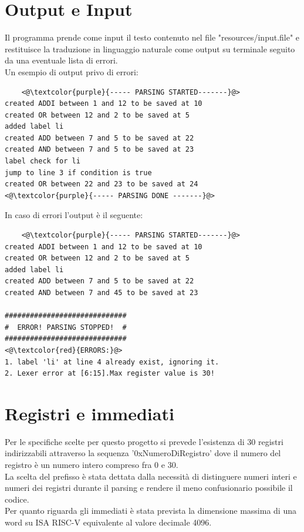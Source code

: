 \section{Output e Input}
Il programma prende come input il testo contenuto nel file "resources/input.file" e restituisce la traduzione in linguaggio naturale come output su terminale seguito da una eventuale lista di errori.
\\Un esempio di output privo di errori:
\begin{lstlisting}
    <@\textcolor{purple}{----- PARSING STARTED-------}@>
created ADDI between 1 and 12 to be saved at 10
created OR between 12 and 2 to be saved at 5
added label li
created ADD between 7 and 5 to be saved at 22
created AND between 7 and 5 to be saved at 23
label check for li
jump to line 3 if condition is true
created OR between 22 and 23 to be saved at 24
<@\textcolor{purple}{----- PARSING DONE -------}@>
\end{lstlisting}
In caso di errori l'output è il seguente:
\begin{lstlisting}
    <@\textcolor{purple}{----- PARSING STARTED-------}@>
created ADDI between 1 and 12 to be saved at 10
created OR between 12 and 2 to be saved at 5
added label li
created ADD between 7 and 5 to be saved at 22
created AND between 7 and 45 to be saved at 23

#############################
#  ERROR! PARSING STOPPED!  #
#############################
<@\textcolor{red}{ERRORS:}@>
1. label 'li' at line 4 already exist, ignoring it.
2. Lexer error at [6:15].Max register value is 30!
\end{lstlisting}






\section{Registri e immediati}
Per le specifiche scelte per questo progetto si prevede l'esistenza di 30 registri indirizzabili attraverso la sequenza '0xNumeroDiRegistro' dove il numero del registro è un numero intero compreso fra 0 e 30.
\\La scelta del prefisso è stata dettata dalla necessità di distinguere numeri interi e numeri dei registri durante il parsing e rendere il meno confusionario possibile il codice.
\\Per quanto riguarda gli immediati è stata prevista la dimensione massima di una word su ISA RISC-V equivalente al valore decimale 4096.
